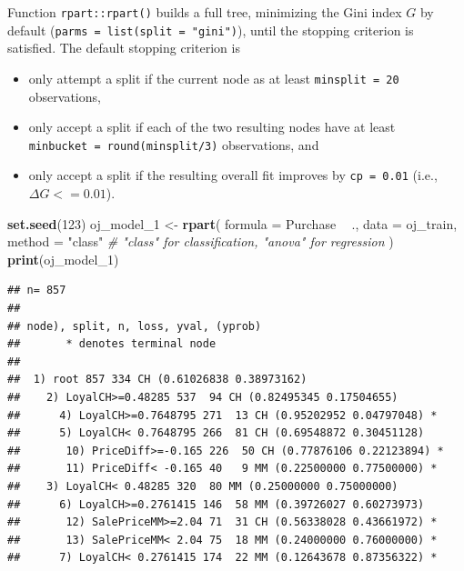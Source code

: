 \documentclass[]{book}
\newenvironment{Shaded}{\begin{snugshade}}{\end{snugshade}}
\newcommand{\CommentTok}[1]{\textcolor[rgb]{0.56,0.35,0.01}{\textit{#1}}}
\newcommand{\DataTypeTok}[1]{\textcolor[rgb]{0.13,0.29,0.53}{#1}}
\newcommand{\DecValTok}[1]{\textcolor[rgb]{0.00,0.00,0.81}{#1}}
\newcommand{\KeywordTok}[1]{\textcolor[rgb]{0.13,0.29,0.53}{\textbf{#1}}}
\newcommand{\NormalTok}[1]{#1}
\newcommand{\OperatorTok}[1]{\textcolor[rgb]{0.81,0.36,0.00}{\textbf{#1}}}
\newcommand{\StringTok}[1]{\textcolor[rgb]{0.31,0.60,0.02}{#1}}
\providecommand{\tightlist}{%
  \setlength{\itemsep}{0pt}\setlength{\parskip}{0pt}}
\begin{document}
Function \texttt{rpart::rpart()} builds a full tree, minimizing the Gini index \(G\) by default (\texttt{parms\ =\ list(split\ =\ "gini")}), until the stopping criterion is satisfied. The default stopping criterion is

\begin{itemize}
\tightlist
\item
  only attempt a split if the current node as at least \texttt{minsplit\ =\ 20} observations,
\item
  only accept a split if each of the two resulting nodes have at least \texttt{minbucket\ =\ round(minsplit/3)} observations, and
\item
  only accept a split if the resulting overall fit improves by \texttt{cp\ =\ 0.01} (i.e., \(\Delta G <= 0.01\)).
\end{itemize}

\begin{Shaded}
\begin{Highlighting}[]
\KeywordTok{set.seed}\NormalTok{(}\DecValTok{123}\NormalTok{)}
\NormalTok{oj_model_}\DecValTok{1}\NormalTok{ <-}\StringTok{ }\KeywordTok{rpart}\NormalTok{(}
   \DataTypeTok{formula =}\NormalTok{ Purchase }\OperatorTok{~}\StringTok{ }\NormalTok{.,}
   \DataTypeTok{data =}\NormalTok{ oj_train,}
   \DataTypeTok{method =} \StringTok{"class"}  \CommentTok{# "class" for classification, "anova" for regression}
\NormalTok{   )}
\KeywordTok{print}\NormalTok{(oj_model_}\DecValTok{1}\NormalTok{)}
\end{Highlighting}
\end{Shaded}

\begin{verbatim}
## n= 857 
## 
## node), split, n, loss, yval, (yprob)
##       * denotes terminal node
## 
##  1) root 857 334 CH (0.61026838 0.38973162)  
##    2) LoyalCH>=0.48285 537  94 CH (0.82495345 0.17504655)  
##      4) LoyalCH>=0.7648795 271  13 CH (0.95202952 0.04797048) *
##      5) LoyalCH< 0.7648795 266  81 CH (0.69548872 0.30451128)  
##       10) PriceDiff>=-0.165 226  50 CH (0.77876106 0.22123894) *
##       11) PriceDiff< -0.165 40   9 MM (0.22500000 0.77500000) *
##    3) LoyalCH< 0.48285 320  80 MM (0.25000000 0.75000000)  
##      6) LoyalCH>=0.2761415 146  58 MM (0.39726027 0.60273973)  
##       12) SalePriceMM>=2.04 71  31 CH (0.56338028 0.43661972) *
##       13) SalePriceMM< 2.04 75  18 MM (0.24000000 0.76000000) *
##      7) LoyalCH< 0.2761415 174  22 MM (0.12643678 0.87356322) *
\end{verbatim}
\end{document}
